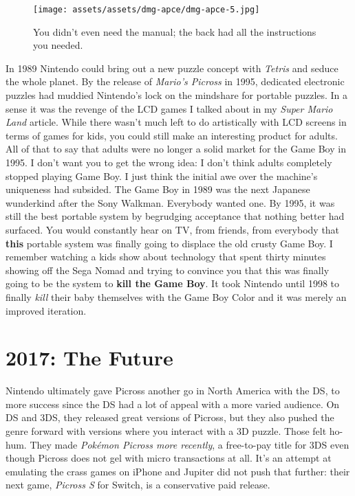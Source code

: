 \documentclass{book}
\begin{document}
\begin{figure}[hbt]
\vskip 10pt
\centering \texttt{[image: assets/assets/dmg-apce/dmg-apce-5.jpg]}\par\pagetwodescription You didn’t even need the manual; the back had all the instructions you needed.
\vskip 6pt
\end{figure}

In 1989 Nintendo could bring out a new puzzle concept with \emph{Tetris} and seduce the whole planet. By the release of \emph{Mario’s Picross} in 1995, dedicated electronic puzzles had muddied Nintendo’s lock on the mindshare for portable puzzles. In a sense it was the revenge of the LCD games I talked about in my \emph{Super Mario Land} article. While there wasn’t much left to do artistically with LCD screens in terms of games for kids, you could still make an interesting product for adults. All of that to say that adults were no longer a solid market for the Game Boy in 1995. I don’t want you to get the wrong idea: I don’t think adults completely stopped playing Game Boy. I just think the initial awe over the machine’s uniqueness had subsided. The Game Boy in 1989 was the next Japanese wunderkind after the Sony Walkman. Everybody wanted one. By 1995, it was still the best portable system by begrudging acceptance that nothing better had surfaced. You would constantly hear on TV, from friends, from everybody that \textbf{this} portable system was finally going to displace the old crusty Game Boy. I remember watching a kids show about technology that spent thirty minutes showing off the Sega Nomad and trying to convince you that this was finally going to be the system to \textbf{kill the Game Boy}. It took Nintendo until 1998 to finally \emph{kill} their baby themselves with the Game Boy Color and it was merely an improved iteration.

\FloatBarrier\needspace{5pt}\section*{2017: The Future}\nopagebreak[4]

Nintendo ultimately gave Picross another go in North America with the DS, to more success since the DS had a lot of appeal with a more varied audience. On DS and 3DS, they released great versions of Picross, but they also pushed the genre forward with versions where you interact with a 3D puzzle. Those felt ho-hum. They made \emph{Pokémon Picross more recently}, a free-to-pay title for 3DS even though Picross does not gel with micro transactions at all. It’s an attempt at emulating the crass games on iPhone and Jupiter did not push that further: their next game, \emph{Picross S} for Switch, is a conservative paid release.
\end{document}
